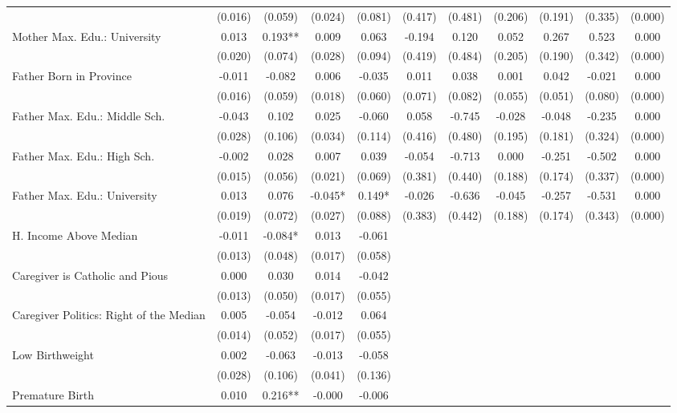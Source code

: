 \begin{tabular}{lcccccccccc}
 & (0.016) & (0.059) & (0.024) & (0.081) & (0.417) & (0.481) & (0.206) & (0.191) & (0.335) & (0.000) \\
Mother Max. Edu.: University & 0.013 & 0.193** & 0.009 & 0.063 & -0.194 & 0.120 & 0.052 & 0.267 & 0.523 & 0.000 \\
 & (0.020) & (0.074) & (0.028) & (0.094) & (0.419) & (0.484) & (0.205) & (0.190) & (0.342) & (0.000) \\
Father Born in Province & -0.011 & -0.082 & 0.006 & -0.035 & 0.011 & 0.038 & 0.001 & 0.042 & -0.021 & 0.000 \\
 & (0.016) & (0.059) & (0.018) & (0.060) & (0.071) & (0.082) & (0.055) & (0.051) & (0.080) & (0.000) \\
Father Max. Edu.: Middle Sch. & -0.043 & 0.102 & 0.025 & -0.060 & 0.058 & -0.745 & -0.028 & -0.048 & -0.235 & 0.000 \\
 & (0.028) & (0.106) & (0.034) & (0.114) & (0.416) & (0.480) & (0.195) & (0.181) & (0.324) & (0.000) \\
Father Max. Edu.: High Sch. & -0.002 & 0.028 & 0.007 & 0.039 & -0.054 & -0.713 & 0.000 & -0.251 & -0.502 & 0.000 \\
 & (0.015) & (0.056) & (0.021) & (0.069) & (0.381) & (0.440) & (0.188) & (0.174) & (0.337) & (0.000) \\
Father Max. Edu.: University & 0.013 & 0.076 & -0.045* & 0.149* & -0.026 & -0.636 & -0.045 & -0.257 & -0.531 & 0.000 \\
 & (0.019) & (0.072) & (0.027) & (0.088) & (0.383) & (0.442) & (0.188) & (0.174) & (0.343) & (0.000) \\
H. Income Above Median & -0.011 & -0.084* & 0.013 & -0.061 &  &  &  &  &  &  \\
 & (0.013) & (0.048) & (0.017) & (0.058) &  &  &  &  &  &  \\
Caregiver is Catholic and Pious & 0.000 & 0.030 & 0.014 & -0.042 &  &  &  &  &  &  \\
 & (0.013) & (0.050) & (0.017) & (0.055) &  &  &  &  &  &  \\
Caregiver Politics: Right of the Median & 0.005 & -0.054 & -0.012 & 0.064 &  &  &  &  &  &  \\
 & (0.014) & (0.052) & (0.017) & (0.055) &  &  &  &  &  &  \\
Low Birthweight & 0.002 & -0.063 & -0.013 & -0.058 &  &  &  &  &  &  \\
 & (0.028) & (0.106) & (0.041) & (0.136) &  &  &  &  &  &  \\
Premature Birth & 0.010 & 0.216** & -0.000 & -0.006 &  &  &  &  &  &  \\

\end{tabular}

